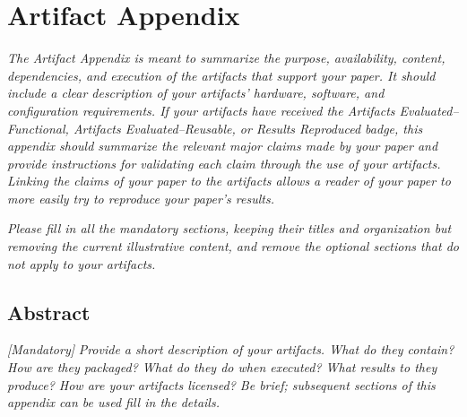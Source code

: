 \documentclass[sigconf]{acmart}
\begin{document}
	
	
	
	
	
	\appendix
	
	\section{Artifact Appendix}
	
	\emph{The Artifact Appendix is meant to summarize the purpose,
		availability, content, dependencies, and execution of the artifacts
		that support your paper.  It should include a clear description of
		your artifacts' hardware, software, and configuration requirements.
		If your artifacts have received the \emph{Artifacts
			Evaluated--Functional}, \emph{Artifacts Evaluated--Reusable}, or
		\emph{Results Reproduced} badge, this appendix should summarize the
		relevant major claims made by your paper and provide instructions for
		validating each claim through the use of your artifacts.  Linking the
		claims of your paper to the artifacts allows a reader of your paper
		to more easily try to reproduce your paper's results.}
	
	\emph{Please fill in all the mandatory sections, keeping their titles
		and organization but removing the current illustrative content, and
		remove the optional sections that do not apply to your artifacts.}
	
	
	\subsection{Abstract}
	
	\emph{[Mandatory]}
	\emph{Provide a short description of your artifacts.  What do they
		contain?  How are they packaged?  What do they do when executed?  What
		results to they produce?  How are your artifacts licensed?  Be brief;
		subsequent sections of this appendix can be used fill in the details.}
	
\end{document}
